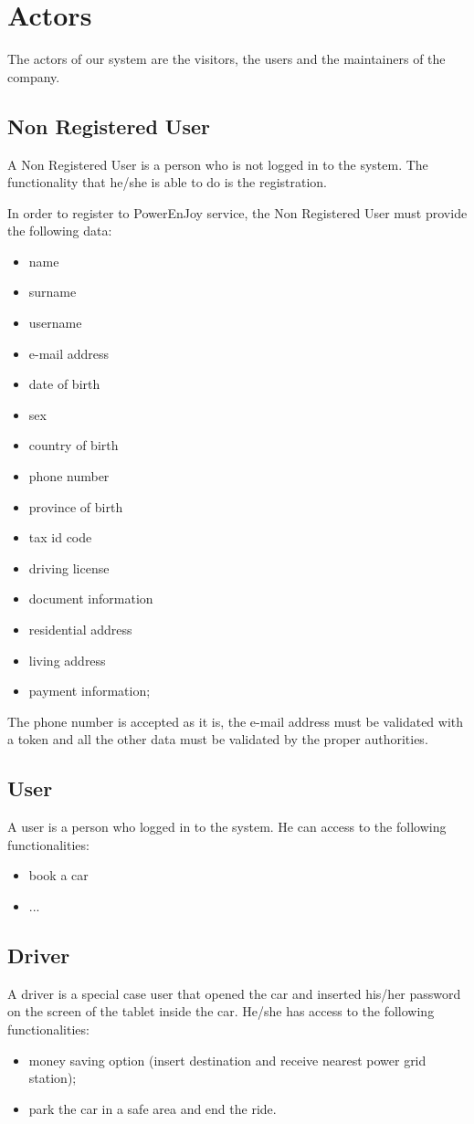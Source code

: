 \section{Actors}
The actors of our system are the visitors, the users and the maintainers of the company.
\subsection{Non Registered User}
A Non Registered User is a person who is not logged in to the system. The functionality that he/she is able to do is the registration.

In order to register to PowerEnJoy service, the Non Registered User must provide the following data:
\begin{itemize}
	\item name
	\item surname
	\item username
	\item e-mail address
	\item date of birth
	\item sex
	\item country of birth
	\item phone number
	\item province of birth
	\item tax id code %
	\item driving license
	\item document information
	\item residential address
	\item living address
	\item payment information;
\end{itemize}

The phone number is accepted as it is, the e-mail address must be validated with a token and all
the other data must be validated by the proper authorities.

\subsection{User}
A user is a person who logged in to the system. He can access to the following functionalities:
\begin{itemize}
	\item book a car
	\item ...
\end{itemize}

\subsection{Driver}
A driver is a special case user that opened the car and inserted his/her password on the screen of the tablet inside the car. He/she has access to the following functionalities:
\begin{itemize}
	\item money saving option (insert destination and receive nearest power grid station);
	\item park the car in a safe area and end the ride.
\end{itemize}

